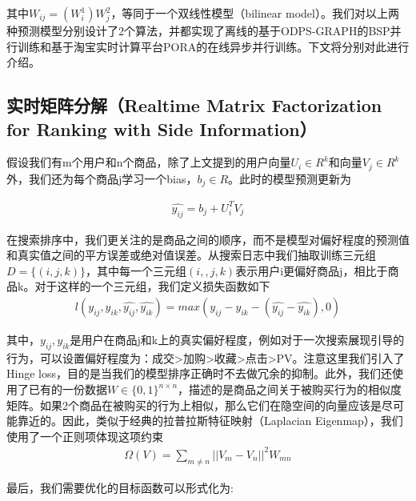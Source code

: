 其中$W_{ij}=(W_i^1) W_j^2$，等同于一个双线性模型（bilinear model）。我们对以上两种预测模型分别设计了2个算法，并都实现了离线的基于ODPS-GRAPH的BSP并行训练和基于淘宝实时计算平台PORA的在线异步并行训练。下文将分别对此进行介绍。
  
 \subsection{实时矩阵分解（Realtime Matrix Factorization for Ranking with Side Information）} 
 
 假设我们有m个用户和n个商品，除了上文提到的用户向量$U_i \in R^k$和向量$V_j \in R^k$外，我们还为每个商品j学习一个bias，$b_j \in R$。此时的模型预测更新为
 
    \begin{equation}\label{uv}
	\begin{split}
		\hat{y_{ij}} = b_j + U_i^T V_j
    	\end{split}
\end{equation}
	
在搜索排序中，我们更关注的是商品之间的顺序，而不是模型对偏好程度的预测值和真实值之间的平方误差或绝对值误差。从搜索日志中我们抽取训练三元组$D= \{(i, j, k)\}$，其中每一个三元组$(i, ,j, k)$表示用户i更偏好商品j，相比于商品k。对于这样的一个三元组，我们定义损失函数如下
    \begin{equation}\label{uv}
	\begin{split}
		l(y_{ij},y_{ik},\hat{y_{ij}},\hat{y_{ik}}) = max(y_{ij}-y_{ik}-(\hat{y_{ij}}-\hat{y_{ik}}), 0)
    	\end{split}
\end{equation}

 其中，$y_{ij}, y_{ik}$是用户在商品j和k上的真实偏好程度，例如对于一次搜索展现引导的行为，可以设置偏好程度为：成交>加购>收藏>点击>PV。注意这里我们引入了Hinge loss，目的是当我们的模型排序正确时不去做冗余的抑制。此外，我们还使用了已有的一份数据$W \in \{0,1\}^{n \times n}$，描述的是商品之间关于被购买行为的相似度矩阵。如果2个商品在被购买的行为上相似，那么它们在隐空间的向量应该是尽可能靠近的。因此，类似于经典的拉普拉斯特征映射（Laplacian Eigenmap），我们使用了一个正则项体现这项约束
     \begin{equation}\label{uv3}
	\begin{split}
		\Omega(V) = \sum_{m \ne n}||V_m-V_n||^2W_{mn}
    	\end{split}
\end{equation}
	
最后，我们需要优化的目标函数可以形式化为:

